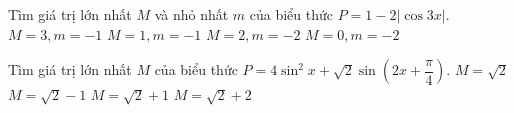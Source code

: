 \begin{ex}%
Tìm giá trị lớn nhất $M$ và nhỏ nhất $m$ của biểu thức $P=1-2\left|{\cos 3x}\right|.$
\choice
{$M=3, m=-1$}
{\True $M=1, m=-1$}
{$M=2, m=-2$}
{\True $M=0, m=-2$}
\loigiai{ } 
\end{ex}

\begin{ex}%
Tìm giá trị lớn nhất $M$ của biểu thức $P=4\sin ^2x+\sqrt{2}\sin \left({2x+\dfrac{\pi}{4}}\right).$
\choice
{$M=\sqrt{2}$}
{$M=\sqrt{2}-1$}
{$M=\sqrt{2}+1$}
{\True $M=\sqrt{2}+2$}
\end{ex}
% 
%        